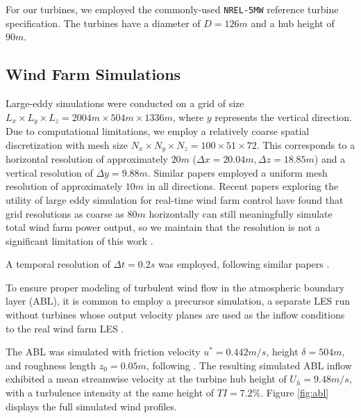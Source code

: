 \documentclass[11pt]{article}
\begin{document}
For our turbines, we employed the commonly-used \texttt{NREL-5MW}
\cite{jonkmanDefinition5MWReference2009} reference turbine specification. The
turbines have a diameter of $D =  126m$ and a hub height of $90m$.

\subsection{Wind Farm Simulations}

Large-eddy simulations were conducted on a grid of size $L_x \times L_y \times
L_z = 2004m \times 504m \times 1336m$, where $y$ represents the vertical
direction.
Due to computational limitations, we employ a relatively coarse
spatial discretization with mesh size $N_x \times N_y \times N_z = 100 \times 51 \times
72$. This corresponds to a horizontal resolution of approximately $20m$
($\Delta x = 20.04m, \Delta z = 18.85m$) and a vertical resolution of $\Delta y
= 9.88m$. Similar papers \cite{bempedelisDatadrivenOptimisationWind2024,
moleMultiFidelityBayesianOptimisation2024} employed a uniform mesh resolution
of approximately $10m$ in all directions. Recent papers exploring the utility
of large eddy simulation for real-time wind farm control have found that grid
resolutions as coarse as $80m$ horizontally can still meaningfully simulate
total wind farm power output, so we maintain that the resolution is not a
significant limitation of this work \cite{janssensRealtimeOptimalControl2024}.

A temporal resolution of $\Delta t = 0.2s$ was employed, following similar papers
\cite{moleMultiFidelityBayesianOptimisation2024, bempedelisDatadrivenOptimisationWind2024}.

To ensure proper modeling of turbulent wind flow in the atmospheric boundary layer (ABL),
it is common to employ a precursor simulation, a separate LES run without turbines
whose output velocity planes are used as the inflow conditions to the real wind farm LES
\cite{lundGenerationTurbulentInflow1998,
ferranteRobustMethodGenerating2004,
stevensConcurrentPrecursorInflow2014}.

The ABL was simulated with friction velocity
$u^* = 0.442 m / s$, height $\delta = 504m$, and roughness length $z_0 = 0.05m$,
following \cite{bempedelisBayesianOptimizationLayout2023}. The resulting simulated ABL
inflow exhibited a mean streamwise velocity at the turbine hub height of $U_h =  9.48 m / s$,
with a turbulence intensity at the same height of $TI = 7.2 \%$. Figure \ref{fig:abl} displays
the full simulated wind profiles.
\end{document}

